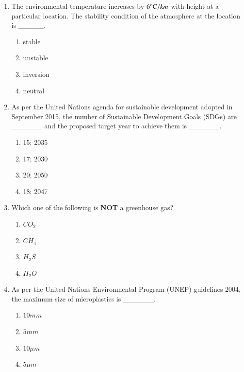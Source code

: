 \documentclass[journal]{IEEEtran}
\begin{document}
\begin{enumerate}
\item The environmental temperature increases by $6\celsius/km$ with height at a particular location. The stability condition of the atmosphere at the location is \_\_\_\_\_.
\hfill{}

\begin{multicols}{2}
\begin{enumerate}
\item stable
\item unstable
\item inversion
\item neutral
\end{enumerate}
\end{multicols}

\item As per the United Nations agenda for sustainable development adopted in September 2015, the number of Sustainable Development Goals (SDGs) are \_\_\_\_\_\_ and the proposed target year to achieve them is \_\_\_\_\_\_.
\hfill{}

\begin{multicols}{2}
\begin{enumerate}
\item 15; 2035
\item 17; 2030
\item 20; 2050
\item 18; 2047
\end{enumerate}
\end{multicols}

\item Which one of the following is \textbf{NOT} a greenhouse gas?
\hfill{}

\begin{multicols}{2}
\begin{enumerate}
\item $CO_2$
\item $CH_4$
\item $H_2S$
\item $H_2O$
\end{enumerate}
\end{multicols}

\item As per the United Nations Environmental Program (UNEP) guidelines 2004, the maximum size of microplastics is \_\_\_\_\_\_.
\hfill{}

\begin{multicols}{2}
\begin{enumerate}
\item $10 mm$
\item $5 mm$
\item $10\mu m$
\item $5 \mu m$
\end{enumerate}
\end{multicols}


\end{enumerate}
\end{document}

